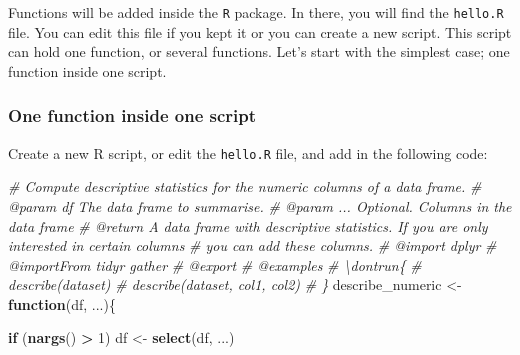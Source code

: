 \documentclass[
]{article}
\newenvironment{Shaded}{\begin{snugshade}}{\end{snugshade}}
\newcommand{\CommentTok}[1]{\textcolor[rgb]{0.56,0.35,0.01}{\textit{#1}}}
\newcommand{\ControlFlowTok}[1]{\textcolor[rgb]{0.13,0.29,0.53}{\textbf{#1}}}
\newcommand{\DecValTok}[1]{\textcolor[rgb]{0.00,0.00,0.81}{#1}}
\newcommand{\KeywordTok}[1]{\textcolor[rgb]{0.13,0.29,0.53}{\textbf{#1}}}
\newcommand{\NormalTok}[1]{#1}
\newcommand{\OperatorTok}[1]{\textcolor[rgb]{0.81,0.36,0.00}{\textbf{#1}}}
\newcommand{\StringTok}[1]{\textcolor[rgb]{0.31,0.60,0.02}{#1}}
\begin{document}
Functions will be added inside the \texttt{R} package. In there, you will find the \texttt{hello.R} file. You can
edit this file if you kept it or you can create a new script. This script can hold one function, or
several functions.
Let's start with the simplest case; one function inside one script.

\hypertarget{one-function-inside-one-script}{%
\subsubsection{One function inside one script}\label{one-function-inside-one-script}}

Create a new R script, or edit the \texttt{hello.R} file, and add in the following code:

\begin{Shaded}
\begin{Highlighting}[]
\CommentTok{\#\textquotesingle{} Compute descriptive statistics for the numeric columns of a data frame.}
\CommentTok{\#\textquotesingle{} @param df The data frame to summarise.}
\CommentTok{\#\textquotesingle{} @param ... Optional. Columns in the data frame}
\CommentTok{\#\textquotesingle{} @return A data frame with descriptive statistics. If you are only interested in certain columns}
\CommentTok{\#\textquotesingle{} you can add these columns.}
\CommentTok{\#\textquotesingle{} @import dplyr}
\CommentTok{\#\textquotesingle{} @importFrom tidyr gather}
\CommentTok{\#\textquotesingle{} @export}
\CommentTok{\#\textquotesingle{} @examples}
\CommentTok{\#\textquotesingle{} \textbackslash{}dontrun\{}
\CommentTok{\#\textquotesingle{} describe(dataset)}
\CommentTok{\#\textquotesingle{} describe(dataset, col1, col2)}
\CommentTok{\#\textquotesingle{} \}}
\NormalTok{describe\_numeric \textless{}{-}}\StringTok{ }\ControlFlowTok{function}\NormalTok{(df, ...)\{}

    \ControlFlowTok{if}\NormalTok{ (}\KeywordTok{nargs}\NormalTok{() }\OperatorTok{\textgreater{}}\StringTok{ }\DecValTok{1}\NormalTok{) df \textless{}{-}}\StringTok{ }\KeywordTok{select}\NormalTok{(df, ...)}


\end{Highlighting}
\end{Shaded}
\end{document}
